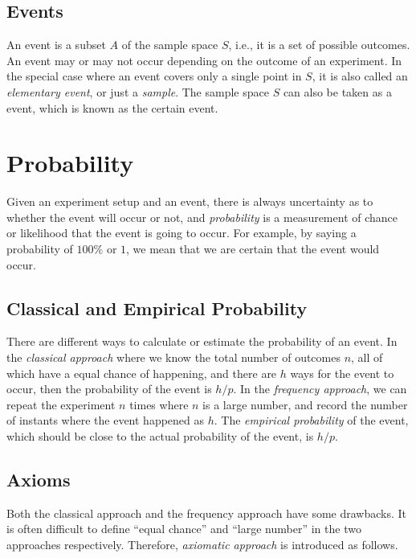 \subsection{Events}

An event is a subset $A$ of the sample space $S$, i.e., it is a set of possible outcomes. An event may or may not occur depending on the outcome of an experiment. In the special case where an event covers only a single point in $S$, it is also called an \textit{elementary event}, or just a \textit{sample}. The sample space $S$ can also be taken as a event, which is known as the certain event.

\section{Probability}

Given an experiment setup and an event, there is always uncertainty as to whether the event will occur or not, and \textit{probability} is a measurement of chance or likelihood that the event is going to occur. For example, by saying a probability of $100\%$ or $1$, we mean that we are certain that the event would occur.

\subsection{Classical and Empirical Probability}

There are different ways to calculate or estimate the probability of an event. In the \textit{classical approach} where we know the total number of outcomes $n$, all of which have a equal chance of happening, and there are $h$ ways for the event to occur, then the probability of the event is $h/p$. In the \textit{frequency approach}, we can repeat the experiment $n$ times where $n$ is a large number, and record the number of instants where the event happened as $h$. The \textit{empirical probability} of the event, which should be close to the actual probability of the event, is $h/p$.

\subsection{Axioms}

Both the classical approach and the frequency approach have some drawbacks. It is often difficult to define ``equal chance'' and ``large number'' in the two approaches respectively. Therefore, \textit{axiomatic approach} is introduced as follows.

